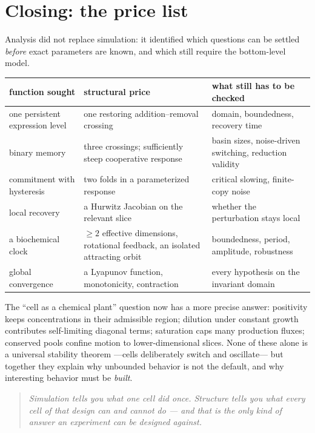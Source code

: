 \documentclass[12pt]{article}
\begin{document}
\section{Closing: the price list}

Analysis did not replace simulation: it identified which questions can be settled
\emph{before} exact parameters are known, and which still require the bottom-level
model.

\begin{center}
\begin{tabular}{p{4.2cm} p{5.2cm} p{4.6cm}}
\hline
\textbf{function sought} & \textbf{structural price} & \textbf{what still has to be checked} \\
\hline
one persistent expression level & one restoring addition--removal crossing & domain, boundedness, recovery time \\
binary memory & three crossings; sufficiently steep cooperative response & basin sizes, noise-driven switching, reduction validity \\
commitment with hysteresis & two folds in a parameterized response & critical slowing, finite-copy noise \\
local recovery & a Hurwitz Jacobian on the relevant slice & whether the perturbation stays local \\
a biochemical clock & $\geq 2$ effective dimensions, rotational feedback, an isolated attracting orbit & boundedness, period, amplitude, robustness \\
global convergence & a Lyapunov function, monotonicity, contraction & every hypothesis on the invariant domain \\
\hline
\end{tabular}
\end{center}

The ``cell as a chemical plant'' question now has a more precise answer: positivity
keeps concentrations in their admissible region; dilution under constant growth
contributes self-limiting diagonal terms; saturation caps many production fluxes;
conserved pools confine motion to lower-dimensional slices. None of these alone is a
universal stability theorem ---cells deliberately switch and oscillate--- but together
they explain why unbounded behavior is not the default, and why interesting behavior
must be \emph{built}.

\begin{quote}
\centering
\emph{Simulation tells you what one cell did once. Structure tells you what every
cell of that design can and cannot do --- and that is the only kind of answer an
experiment can be designed against.}
\end{quote}
\end{document}
